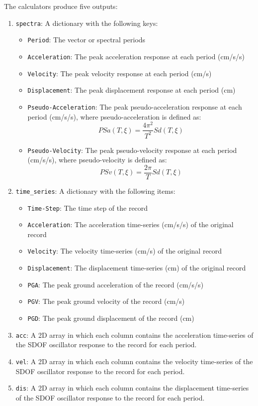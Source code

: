 The calculators produce five outputs:
\begin{enumerate}
\item \verb=spectra=: A dictionary with the following keys:
    \begin{itemize}
    \item \verb=Period=: The vector or spectral periods
    \item \verb=Acceleration=: The peak acceleration response at each period (cm/s/s)
    \item \verb=Velocity=: The peak velocity response at each period (cm/s)
    \item \verb=Displacement=: The peak displacement response at each period (cm)
    \item \verb=Pseudo-Acceleration=: The peak pseudo-acceleration response at each period (cm/s/s), where pseudo-acceleration is defined as:
    \begin{equation}
    PSa \left( {T, \xi} \right) = \frac{4 \pi^2}{T ^ 2} Sd \left( {T, \xi} \right)
    \end{equation}
 
    \item \verb=Pseudo-Velocity=: The peak pseudo-velocity response at each period (cm/s/s), where pseudo-velocity is defined as:
    \begin{equation}
    PSv \left( {T, \xi} \right) = \frac{2\pi}{T} Sd \left( {T, \xi} \right)
    \end{equation}
    \end{itemize}
\item \verb=time_series=: A dictionary with the following items:
    \begin{itemize}
    \item \verb=Time-Step=: The time step of the record
    \item \verb=Acceleration=: The acceleration time-series (cm/s/s) of the original record
    \item \verb=Velocity=: The velocity time-series (cm/s) of the original record
    \item \verb=Displacement=: The displacement time-series (cm) of the original record
    \item \verb=PGA=: The peak ground acceleration of the record (cm/s/s)
    \item \verb=PGV=: The peak ground velocity of the record (cm/s)
    \item \verb=PGD=: The peak ground displacement of the record (cm)
    \end{itemize}
\item \verb=acc=: A 2D array in which each column contains the acceleration time-series of the SDOF oscillator response to the record for each period. 
\item \verb=vel=: A 2D array in which each column contains the velocity time-series of the SDOF oscillator response to the record for each period. 
\item \verb=dis=: A 2D array in which each column contains the displacement time-series of the SDOF oscillator response to the record for each period. 
\end{enumerate}

